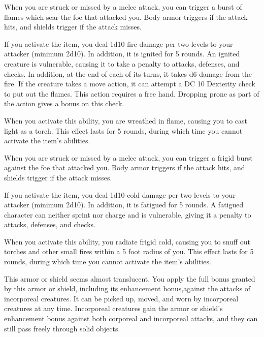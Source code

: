 
 When you are struck or missed by a melee attack, you can trigger a burst of flames which sear the foe that attacked you. Body armor triggers if the attack hits, and shields trigger if the attack misses.

If you activate the item, you deal 1d10 fire damage per two levels to your attacker (minimum 2d10). In addition, it is ignited for 5 rounds. An ignited creature is vulnerable, causing it to take a  penalty to attacks, defenses, and checks. In addition, at the end of each of its turns, it takes d6 damage from the fire. If the creature takes a move action, it can attempt a DC 10 Dexterity check to put out the flames. This action requires a free hand. Dropping prone as part of the action gives a  bonus on this check.

When you activate this ability, you are wreathed in flame, causing you to cast light as a torch. This effect lasts for 5 rounds, during which time you cannot activate the item's abilities.


 When you are struck or missed by a melee attack, you can trigger a frigid burst against the foe that attacked you. Body armor triggers if the attack hits, and shields trigger if the attack misses.

If you activate the item, you deal 1d10 cold damage per two levels to your attacker (minimum 2d10). In addition, it is fatigued for 5 rounds. A fatigued character can neither sprint nor charge and is vulnerable, giving it a  penalty to attacks, defenses, and checks.

When you activate this ability, you radiate frigid cold, causing you to snuff out torches and other small fires within a 5 foot radius of you. This effect lasts for 5 rounds, during which time you cannot activate the item's abilities.


 This armor or shield seems almost translucent. You apply the full bonus granted by this armor or shield, including its enhancement bonus,against the attacks of incorporeal creatures. It can be picked up, moved, and worn by incorporeal creatures at any time. Incorporeal creatures gain the armor or shield's enhancement bonus against both corporeal and incorporeal attacks, and they can still pass freely through solid objects.

